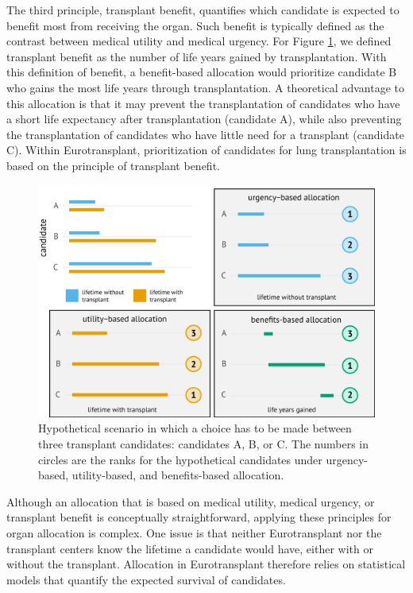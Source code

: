 \documentclass[11pt,twoside,]{book}
\begin{document}
The third principle, transplant benefit, quantifies which candidate is expected
to benefit most from receiving the organ. Such benefit is typically defined
as the contrast between medical utility and medical urgency. For Figure \ref{fig:ch1fig1},
we defined transplant benefit as the number of life years gained by transplantation.
With this definition of benefit, a benefit-based allocation would prioritize
candidate B who gains the most life years through transplantation. A theoretical
advantage to this allocation is that it may prevent the transplantation of candidates
who have a short life expectancy after transplantation (candidate A), while
also preventing the transplantation of candidates
who have little need for a transplant (candidate C). Within Eurotransplant, prioritization of candidates for lung transplantation is based on the principle of transplant benefit.

\begin{figure}[h]

{\centering \includegraphics[width=1\linewidth]{figures/ch1//fig1-allocation_principles} 

}

\caption{Hypothetical scenario in which a choice has to be made between three
  transplant candidates: candidates A, B, or C. The numbers in circles
  are the ranks for the hypothetical candidates under urgency-based,
  utility-based, and benefits-based allocation.}\label{fig:ch1fig1}
\end{figure}

Although an allocation that is based on medical utility, medical urgency, or
transplant benefit is conceptually straightforward, applying these principles
for organ allocation is complex. One issue is that neither Eurotransplant nor
the transplant centers know the lifetime a candidate would have, either with or
without the transplant. Allocation in Eurotransplant therefore relies on statistical
models that quantify the expected survival of candidates.
\end{document}
